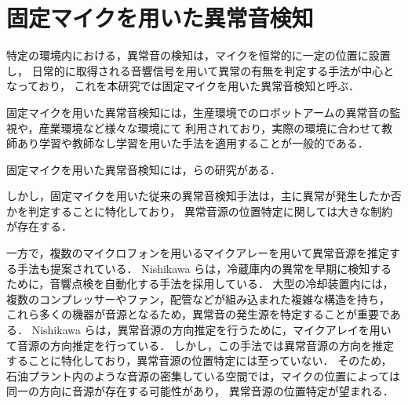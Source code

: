 \documentclass[../main]{subfiles}
\begin{document}
\section{固定マイクを用いた異常音検知}
\label{sec:anomaly}
特定の環境内における，異常音の検知は，マイクを恒常的に一定の位置に設置し，
日常的に取得される音響信号を用いて異常の有無を判定する手法が中心となっており，
これを本研究では固定マイクを用いた異常音検知と呼ぶ．


固定マイクを用いた異常音検知には，生産環境でのロボットアームの異常音の監視や，産業環境など様々な環境にて
利用されており，実際の環境に合わせて教師あり学習や教師なし学習を用いた手法を適用することが一般的である．

固定マイクを用いた異常音検知には，らの研究がある．

しかし，固定マイクを用いた従来の異常音検知手法は，主に異常が発生したか否かを判定することに特化しており，
異常音源の位置特定に関しては大きな制約が存在する．

一方で，複数のマイクロフォンを用いるマイクアレーを用いて異常音源を推定する手法も提案されている．
Nishikawa らは，冷蔵庫内の異常を早期に検知するために，音響点検を自動化する手法を採用している．
大型の冷却装置内には，複数のコンプレッサーやファン，配管などが組み込まれた複雑な構造を持ち，
これら多くの機器が音源となるため，異常音の発生源を特定することが重要である．
Nishikawa らは，異常音源の方向推定を行うために，マイクアレイを用いて音源の方向推定を行っている．
しかし，この手法では異常音源の方向を推定することに特化しており，異常音源の位置特定には至っていない．
そのため，石油プラント内のような音源の密集している空間では，マイクの位置によっては同一の方向に音源が存在する可能性があり，
異常音源の位置特定が望まれる．
\end{document}
